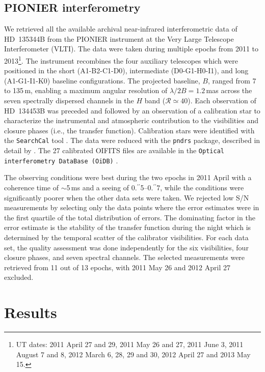 \documentclass[twocolumn,tighten]{aastex61}
\newcommand{\ffarcs}{\mbox{\ensuremath{.\!\!^{\prime\prime}}}}
\begin{document}
\subsection{PIONIER interferometry}\label{sec:pionier}

We retrieved all the available archival near-infrared interferometric data of HD~135344B from the PIONIER instrument \citep{lebouquin2011} at the Very Large Telescope Interferometer (VLTI). The data were taken during multiple epochs from 2011 to 2013\footnote{UT dates: 2011 April 27 and 29, 2011 May 26 and 27, 2011 June 3, 2011 August 7 and 8, 2012 March 6, 28, 29 and 30, 2012 April 27 and 2013 May 15.}. The instrument recombines the four auxiliary telescopes which were positioned in the short (A1-B2-C1-D0), intermediate (D0-G1-H0-I1), and long (A1-G1-I1-K0) baseline configurations. The projected baseline, $B$, ranged from 7 to 135\,m, enabling a maximum angular resolution of $\lambda/2B = 1.2$\,mas across the seven spectrally dispersed channels in the $H$ band ($\mathcal{R}\simeq40$). Each observation of HD~134453B was preceded and followed by an observation of a calibration star to characterize the instrumental and atmospheric contribution to the visibilities and closure phases (i.e., the transfer function). Calibration stars were identified with the \texttt{SearchCal} tool \citep{bonneau2006,bonneau2011}. The data were reduced with the \texttt{pndrs} package, described in detail by \citet{lebouquin2011}. The 27 calibrated OIFITS files \citep{pauls2005} are available in the \texttt{Optical interferometry DataBase (OiDB)} \citep{haubois2016}.

The observing conditions were best during the two epochs in 2011 April with a coherence time of $\sim$5\,ms and a seeing of 0\ffarcs5--0\ffarcs7, while the conditions were significantly poorer when the other data sets were taken. We rejected low S/N measurements by selecting only the data points where the error estimates were in the first quartile of the total distribution of errors. The dominating factor in the error estimate is the stability of the transfer function during the night which is determined by the temporal scatter of the calibrator visibilities. For each data set, the quality assessment was done independently for the six visibilities, four closure phases, and seven spectral channels. The selected measurements were retrieved from 11 out of 13 epochs, with 2011 May 26 and 2012 April 27 excluded.

\section{Results}\label{sec:results}
\end{document}
